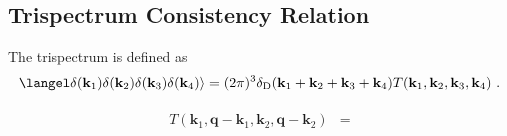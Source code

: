 \newcommand{\sph}[2]{Y^\text{R}_{l_#1 m_#1}(\hat{#2})}

\newcommand{\jl}[1]{j_{l_#1}}
\newcommand{\dk}{\frac{ d^3 \mathbf{k}}{(2 \pi)^3}} 
\newcommand{ \dkv}[1]{\frac{ d^3 \mathbf{k}_{#1}}{(2 \pi)^3}} 
\newcommand{\obs}{\mathcal{O}}

\subsection{Trispectrum Consistency Relation}

The trispectrum is defined as
\begin{align} 
\langel \delta(\mathbf{k}_1) \delta(\mathbf{k}_2)\delta(\mathbf{k}_3)\delta(\mathbf{k}_4) \rangle = (2 \pi)^3 \delta_\text{D}(\mathbf{k}_1+ \mathbf{k}_2+ \mathbf{k}_3+ \mathbf{k}_4 )T(\mathbf{k}_1, \mathbf{k}_2, \mathbf{k}_3, \mathbf{k}_4 )~. 
\end{align} 

\begin{align}
\begin{split} 
T(\mathbf{k}_1, \mathbf{q}-\mathbf{k}_1, \mathbf{k}_2, \mathbf{q}- \mathbf{k}_2) & = \\
\end{split} 
\end{align} 

